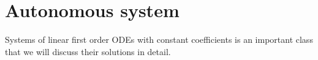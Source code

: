 
\section{Autonomous system}

Systems of linear first order ODEs with constant coefficients is an important class 
that we will discuss their solutions in detail.

